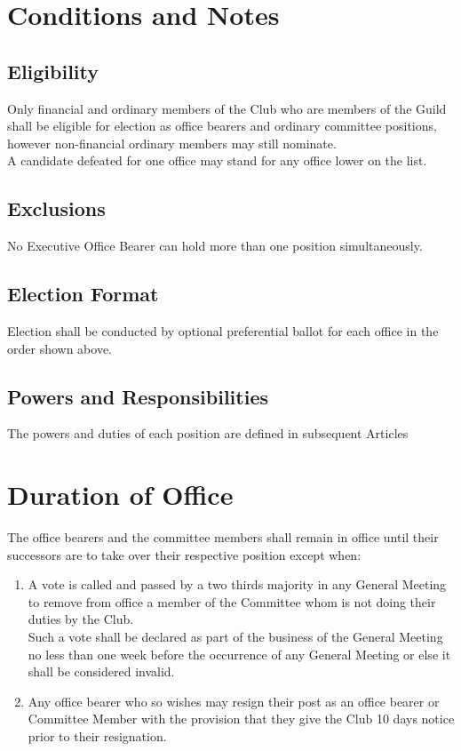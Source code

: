 \documentclass[10pt,a4paper]{report}
\begin{document}
	\section{Conditions and Notes}
		\subsection{Eligibility} Only financial and ordinary members of the Club who are members of the Guild shall be eligible for election as office bearers and ordinary committee positions, however non-financial ordinary members may still nominate.\\
		A candidate defeated for one office may stand for any office lower on the list.
		
		\subsection{Exclusions} No Executive Office Bearer can hold more than one position simultaneously.
		
		\subsection{Election Format} Election shall be conducted by optional preferential ballot for each office in the order shown above.
		
		\subsection{Powers and Responsibilities} The powers and duties of each position are defined in subsequent Articles
		
	\section{Duration of Office}
		The office bearers and the committee members shall remain in office until their successors are to take over their respective position except when:
			\begin{enumerate}[label=\alph*]
			\item A vote is called and passed by a two thirds majority in any General Meeting to remove from office a member of the Committee whom is not doing their duties by the Club.\\
			Such a vote shall be declared as part of the business of the General Meeting no less than one week before the occurrence of any General Meeting or else it shall be considered invalid.
			\item Any office bearer who so wishes may resign their post as an office bearer or Committee Member with the provision that they give the Club 10 days notice prior to their resignation.
		\end{enumerate}
\end{document}
